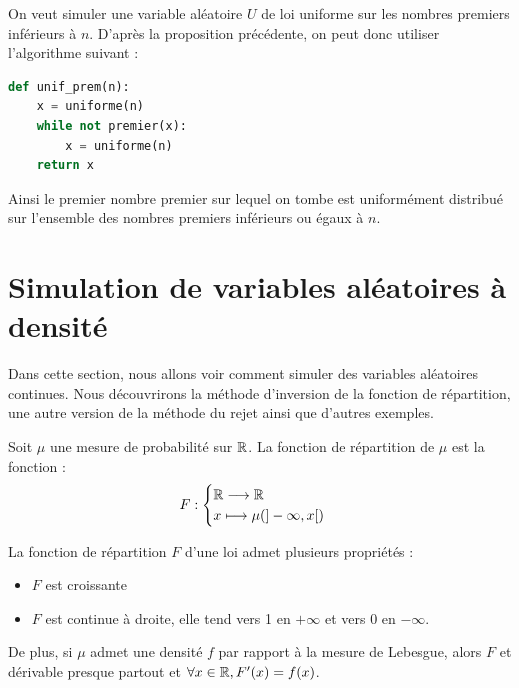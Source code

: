 \begin{example}
    On veut simuler une variable aléatoire $U$ de loi uniforme sur les nombres premiers inférieurs à $n$. 
    D'après la proposition précédente, on peut donc utiliser l'algorithme suivant : 
    \begin{lstlisting}[language=Python]
def unif_prem(n):
    x = uniforme(n)
    while not premier(x): 
        x = uniforme(n) 
    return x
    \end{lstlisting}
    Ainsi le premier nombre premier sur lequel on tombe est uniformément distribué sur l'ensemble des nombres premiers 
    inférieurs ou égaux à $n$. 
\end{example}


\section{Simulation de variables aléatoires à densité}

Dans cette section, nous allons voir comment simuler des variables aléatoires continues. 
Nous découvrirons la méthode d'inversion de la fonction de répartition, une autre version de la méthode 
du rejet ainsi que d'autres exemples. 

\begin{rappel}
    Soit $ \mu$ une mesure de probabilité sur $\mathbb{R}$. La fonction de répartition de $ \mu$ est la fonction :  
        $$ F : 
            \begin{cases}
                \mathbb{R} \longrightarrow \mathbb{R} \\ 
                x \longmapsto \mu (]-\infty, x[ )
            \end{cases}
        $$
\end{rappel}

\begin{proposition}
    La fonction de répartition $F$ d'une loi admet plusieurs propriétés : 
    \begin{itemize} 
        \item $F$ est croissante 
        \item $F$ est continue à droite, elle tend vers 1 en $ + \infty$ et vers $0$ en $ - \infty$. 
    \end{itemize}
    De plus, si $ \mu$ admet une densité $f$ par rapport à la mesure de Lebesgue, alors $F$ et dérivable
    presque partout et $ \forall x \in \mathbb{R}, F'(x) = f(x)$. 
\end{proposition}

